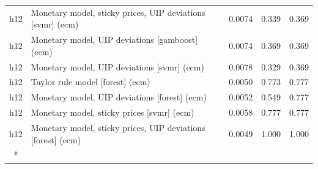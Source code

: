 \begin{ThreePartTable}
\begin{longtable}[t]{cp{5.5cm}ccc}
h12 & \raggedright Monetary model, sticky prices, UIP deviations [svmr] (ecm) & 0.0074 & 0.339 & 0.369\\
h12 & \raggedright Monetary model, UIP deviations [gamboost] (ecm) & 0.0074 & 0.369 & 0.369\\
h12 & \raggedright Monetary model, UIP deviations [svmr] (ecm) & 0.0078 & 0.329 & 0.369\\
h12 & \raggedright Taylor rule model [forest] (ecm) & 0.0050 & 0.773 & 0.777\\
h12 & \raggedright Monetary model, UIP deviations [forest] (ecm) & 0.0052 & 0.549 & 0.777\\
h12 & \raggedright Monetary model, sticky prices [svmr] (ecm) & 0.0058 & 0.777 & 0.777\\
h12 & \raggedright Monetary model, sticky prices, UIP deviations [forest] (ecm) & 0.0049 & 1.000 & 1.000\\*
\end{longtable}
\end{ThreePartTable}
\endgroup{}
